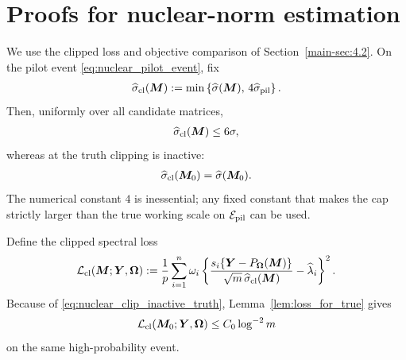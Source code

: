 \documentclass[numsec,webpdf,modern,large,namedate]{oup-authoring-template}
\theoremstyle{plain}
\theoremstyle{remark}
\newcommand{\M}{\bm{M}}
\newcommand{\Y}{\bm{Y}}
\newcommand{\bOmega}{\bm{\Omega}}
\newif\ifmarkchanges
\newenvironment{revision}{\begingroup\ifmarkchanges\color{red}\fi}{\endgroup}
\begin{document}
\begin{revision}
\section{Proofs for nuclear-norm estimation}
\label{sec:nuclear_estimation}

We use the clipped loss and objective comparison of Section~\ref{main-sec:4.2}.
On the pilot event
\eqref{eq:nuclear_pilot_event}, fix
\begin{align}
\label{eq:nuclear_clip_definition}
 \widehat\sigma_{\rm cl}(\M)
 :=
 \min\left\{
 \widehat\sigma(\M),\,
 4\widehat\sigma_{\rm pil}
 \right\}.
\end{align}
Then, uniformly over all candidate matrices,
\begin{align}
\label{eq:nuclear_clip_uniform}
 \widehat\sigma_{\rm cl}(\M)
 \le
 6\sigma,
\end{align}
whereas at the truth clipping is inactive:
\begin{align}
\label{eq:nuclear_clip_inactive_truth}
 \widehat\sigma_{\rm cl}(\M_0)
 =
 \widehat\sigma(\M_0).
\end{align}
The numerical constant $4$ is inessential; any fixed constant that makes
the cap strictly larger than the true working scale on
$\mathcal E_{\rm pil}$ can be used.

Define the clipped spectral loss
\begin{align}
\label{eq:nuclear_clipped_loss}
 \mathcal L_{\rm cl}(\M;\Y,\bOmega)
 :=
 \frac1p
 \sum_{i=1}^n
 \omega_i
 \left\{
 \frac{
 s_i\{\Y-P_{\bOmega}(\M)\}
 }{
 \sqrt m\,\widehat\sigma_{\rm cl}(\M)
 }
 -
 \widehat\lambda_i
 \right\}^2.
\end{align}
Because of \eqref{eq:nuclear_clip_inactive_truth},
Lemma~\ref{lem:loss_for_true} gives
\begin{align}
\label{eq:nuclear_clipped_true_loss}
 \mathcal L_{\rm cl}(\M_0;\Y,\bOmega)
 \le
 C_0\log^{-2}m
\end{align}
on the same high-probability event.


\end{revision}
\end{document}
